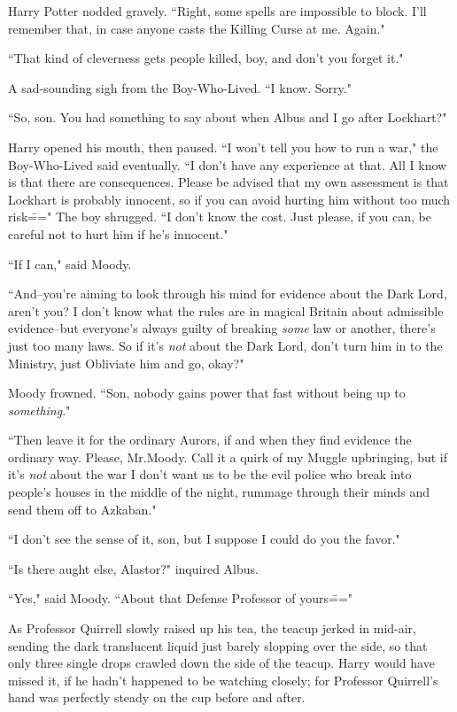 Harry Potter nodded gravely. ``Right, some spells are impossible to block. I'll remember that, in case anyone casts the Killing Curse at me. Again."

``That kind of cleverness gets people killed, boy, and don't you forget it."

A sad-sounding sigh from the Boy-Who-Lived. ``I know. Sorry."

``So, son. You had something to say about when Albus and I go after Lockhart?"

Harry opened his mouth, then paused. ``I won't tell you how to run a war," the Boy-Who-Lived said eventually. ``I don't have any experience at that. All I know is that there are consequences. Please be advised that my own assessment is that Lockhart is probably innocent, so if you can avoid hurting him without too much risk\===" The boy shrugged. ``I don't know the cost. Just please, if you can, be careful not to hurt him if he's innocent."

``If I can," said Moody.

``And\---you're aiming to look through his mind for evidence about the Dark Lord, aren't you? I don't know what the rules are in magical Britain about admissible evidence\---but everyone's always guilty of breaking \emph{some} law or another, there's just too many laws. So if it's \emph{not} about the Dark Lord, don't turn him in to the Ministry, just Obliviate him and go, okay?"

Moody frowned. ``Son, nobody gains power that fast without being up to \emph{something}."

``Then leave it for the ordinary Aurors, if and when they find evidence the ordinary way. Please, Mr.\?Moody. Call it a quirk of my Muggle upbringing, but if it's \emph{not} about the war I don't want us to be the evil police who break into people's houses in the middle of the night, rummage through their minds and send them off to Azkaban."

``I don't see the sense of it, son, but I suppose I could do you the favor."

``Is there aught else, Alastor?" inquired Albus.

``Yes," said Moody. ``About that Defense Professor of yours\==="



As Professor Quirrell slowly raised up his tea, the teacup jerked in mid-air, sending the dark translucent liquid just barely slopping over the side, so that only three single drops crawled down the side of the teacup. Harry would have missed it, if he hadn't happened to be watching closely; for Professor Quirrell's hand was perfectly steady on the cup before and after.

